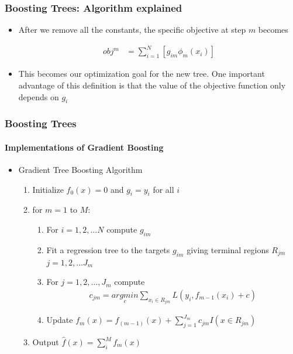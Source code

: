 \documentclass[
  shownotes,
  xcolor={svgnames},
  hyperref={colorlinks,citecolor=DarkBlue,linkcolor=DarkRed,urlcolor=DarkBlue}
  , aspectratio=169]{beamer}
\begin{document}
\begin{frame}[fragile]
\frametitle{Boosting Trees: Algorithm explained}


\begin{itemize}
\item After we remove all the constants, the specific objective at step $m$ becomes


\begin{align}
obj^m &= \sum_{i=1}^N \left[ g_{im} \phi_m(x_i) \right]
\end{align}

\item This becomes our optimization goal for the new tree. One important advantage of this definition is that the value of the objective function only depends on $g_i$ 
\end{itemize}
 \end{frame}


\begin{frame}[fragile]
\frametitle{Boosting Trees}
\framesubtitle{Implementations of Gradient Boosting}

\begin{itemize}
\item Gradient Tree Boosting Algorithm
\medskip
\begin{enumerate}
\item Initialize $f_0(x)=0$ and $g_i=y_i$ for all $i$
\medskip
\item for $m=1$ to $M$:
  \begin{enumerate}
      \item For $i=1,2,\dots N$ compute $g_{im}$
      \medskip
      \item Fit a regression tree to the targets $g_{im}$ giving terminal regions $R_{jm}$ $j=1,2,\dots J_m$
      \medskip
      \item For $j=1,2,\dots,J_m$ compute
      \begin{align}
       c_{jm} =\underset{c}{argmin} \sum_{x_i\in R_{jm} } L(y_i,f_{m-1}(x_i)+c)
      \end{align}
      \medskip
      \item Update $f_m (x)=f_{(m-1)}(x) + \sum_{j=1}^{J_m} c_{jm} I(x \in R_{jm})$
      \medskip
  \end{enumerate}
  \item Output $\hat{f}(x)=\sum^M_i f_m(x)$
\end{enumerate}


\end{itemize}

\end{frame}
\end{document}
